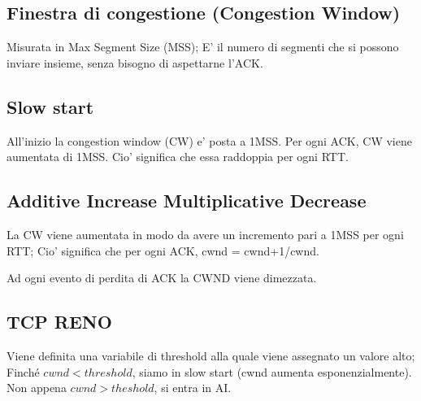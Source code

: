 \subsection{Finestra di congestione (Congestion Window)}
Misurata in Max Segment Size (MSS); E' il numero di segmenti che si possono inviare insieme, senza bisogno di aspettarne l'ACK. %
\subsection{Slow start}
All'inizio la congestion window (CW) e' posta a 1MSS.
Per ogni ACK, CW viene aumentata di 1MSS. Cio' significa che essa raddoppia per ogni RTT.
\subsection{Additive Increase Multiplicative Decrease}
La CW viene aumentata in modo da avere un incremento pari a 1MSS per ogni RTT;
Cio' significa che per ogni ACK, cwnd = cwnd+1/cwnd.

Ad ogni evento di perdita di ACK la CWND viene dimezzata.
\subsection{TCP RENO}
Viene definita una variabile di threshold alla quale viene assegnato un valore alto;
Finché $cwnd < threshold$, siamo in slow start (cwnd aumenta esponenzialmente).\newline
Non appena $cwnd > theshold$, si entra in AI.

